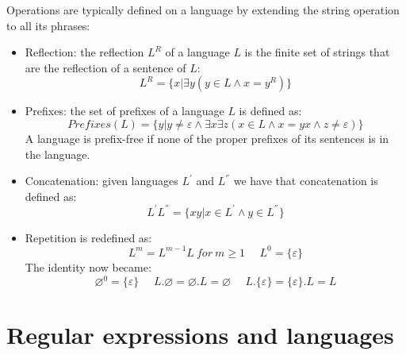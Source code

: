 \documentclass[12pt, a4paper]{report}
\newtheorem[style=M,bodystyle=\normalfont]{theorem}{Theorem}
\newtheorem[style=M,bodystyle=\normalfont]{corollary}{Corollary}
\newtheorem[style=M,bodystyle=\normalfont]{lemma}{Lemma}
\newtheorem[style=M,bodystyle=\normalfont]{definition}{Definition}
\begin{document}
    Operations are typically defined on a language by extending the string operation to all its phrases: 
    \begin{itemize}
        \item Reflection: the reflection $L^R$ of a language $L$ is the finite set of strings that are the reflection of a sentence of $L$: 
            \[L^R = \{ x | \exists y \left( y \in L \land x=y^R \right)\}\]
        \item Prefixes: the set of prefixes of a language $L$ is defined as: 
            \[Prefixes(L)=\{y | y \neq \varepsilon \land \exists x \exists z \left( x \in L \land x=yx \land z \neq \varepsilon \right)\}\]
            A language is prefix-free if none of the proper prefixes of its sentences is in the language. 
        \item Concatenation: given languages $L^{'}$ and $L^{''}$ we have that concatenation is defined as: 
            \[L^{'}L^{''}=\{ xy | x \in L^{'} \land y \in L^{''} \}\]
        \item Repetition is redefined as: 
            \[L^m=L^{m-1}L \:for \: m \geq 1 \:\:\:\:\:\: L^0=\{ \varepsilon \}\]
            The identity now became: 
            \[\varnothing ^0 = \{ \varepsilon \} \:\:\:\:\:\: L.\varnothing=\varnothing .L=\varnothing \:\:\:\:\:\: L.\{\varepsilon\}=\{\varepsilon\} .L=L\]
    \end{itemize}








    \section{Regular expressions and languages}
\end{document}
